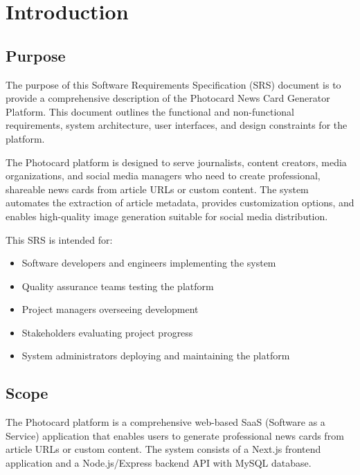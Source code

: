 \documentclass[12pt,a4paper]{article}
\begin{document}
\newpage

\tableofcontents
\newpage

\section{Introduction}

\subsection{Purpose}

The purpose of this Software Requirements Specification (SRS) document is to provide a comprehensive description of the Photocard News Card Generator Platform. This document outlines the functional and non-functional requirements, system architecture, user interfaces, and design constraints for the platform.

The Photocard platform is designed to serve journalists, content creators, media organizations, and social media managers who need to create professional, shareable news cards from article URLs or custom content. The system automates the extraction of article metadata, provides customization options, and enables high-quality image generation suitable for social media distribution.

This SRS is intended for:
\begin{itemize}
    \item Software developers and engineers implementing the system
    \item Quality assurance teams testing the platform
    \item Project managers overseeing development
    \item Stakeholders evaluating project progress
    \item System administrators deploying and maintaining the platform
\end{itemize}

\subsection{Scope}

The Photocard platform is a comprehensive web-based SaaS (Software as a Service) application that enables users to generate professional news cards from article URLs or custom content. The system consists of a Next.js frontend application and a Node.js/Express backend API with MySQL database.
\end{document}
